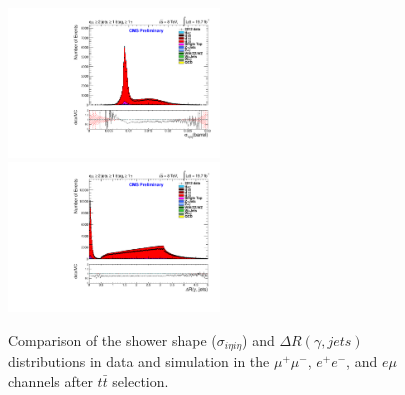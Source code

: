 \documentclass[oneside, a4paper, 11pt, ]{report}
\begin{document}
\begin{figure}
\includegraphics[width=0.5\textwidth]{Plots/ControlPlots/TTbarDiLeptonAnalysis/EMu/Photons/AllPhotons/Photon_sigma_ietaieta_barrel_splitTTbar_ratio.pdf}
\includegraphics[width=0.5\textwidth]{Plots/ControlPlots/TTbarDiLeptonAnalysis/EMu/Photons/AllPhotons/Photon_deltaR_jets_splitTTbar_ratio.pdf}
\caption{Comparison of the shower shape ($\sigma_{i\eta i\eta}$) and $\Delta R(\gamma, jets)$ distributions in data and simulation in the $\mu^{+}\mu^{-}$, $e^{+}e^{-}$, and $e\mu$ channels after $t\bar{t}$ selection.}
\label{fig-ttbarShowerShapeAndDRjets}
\end{figure}
\end{document}
